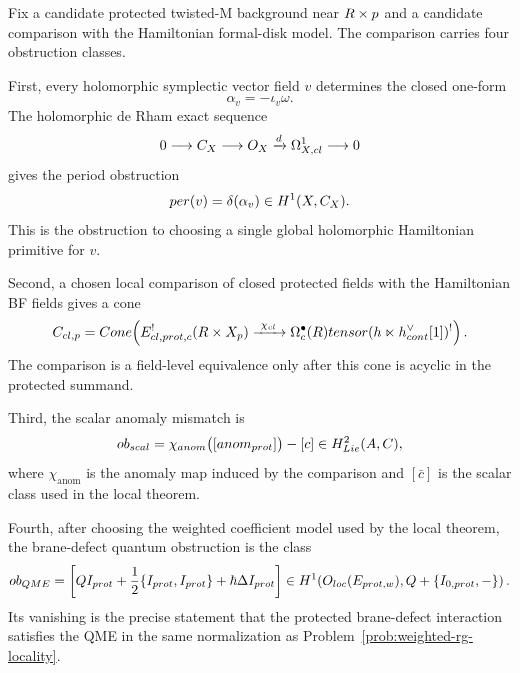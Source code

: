 \begin{defn}\label{defn:protected-twist-obstruction-datum}
  Fix a candidate protected twisted-M background near
  \(R\times p\) and a candidate comparison with the Hamiltonian
  formal-disk model.  The comparison carries four obstruction classes.

  First, every holomorphic symplectic vector field \(v\) determines the
  closed one-form
  \[
    \alpha_v=-\iota_v\omega.
  \]
  The holomorphic de Rham exact sequence
  \[
    0\longrightarrow C_X\longrightarrow O_X
      \xrightarrow{d}\Omega^1_{X,cl}\longrightarrow0
  \]
  gives the period obstruction
  \[
    per(v)=\delta(\alpha_v)\in H^1(X,C_X).
  \]
  This is the obstruction to choosing a single global holomorphic
  Hamiltonian primitive for \(v\).

  Second, a chosen local comparison of closed protected fields with the
  Hamiltonian BF fields gives a cone
  \[
  C_{cl,p}=
  Cone\!\left(
    E_{cl,prot,c}^{!}(R\times X_p)
      \xrightarrow{\ \chi_{cl}\ }
    \Omega^\bullet_c(R)tensor
      (h\ltimes
       h^{\vee}_{cont}[1])^{!}
  \right).
  \]
  The comparison is a field-level equivalence only after this cone is
  acyclic in the protected summand.

  Third, the scalar anomaly mismatch is
  \[
    ob_{scal}
      =
    \chi_{anom}\bigl([anom_{prot}]\bigr)
      -[c]\in H^2_{Lie}(A,C),
  \]
  where \(\chi_{\mathrm{anom}}\) is the anomaly map induced by the
  comparison and \([\bar c]\) is the scalar class used in the local
  theorem.

  Fourth, after choosing the weighted coefficient model used by the
  local theorem, the brane-defect quantum obstruction is the class
  \[
  ob_{QME}=
  \left[
    QI_{prot}
    +\frac12\{I_{prot},I_{prot}\}
    +\hbar\Delta I_{prot}
  \right]
  \in
  H^1\!\left(
    O_{loc}(E_{prot,w}),
    Q+\{I_{0,prot},-\}
  \right).
  \]
  Its vanishing is the precise statement that the protected brane-defect
  interaction satisfies the QME in the same normalization as
  Problem~\ref{prob:weighted-rg-locality}.
\end{defn}

